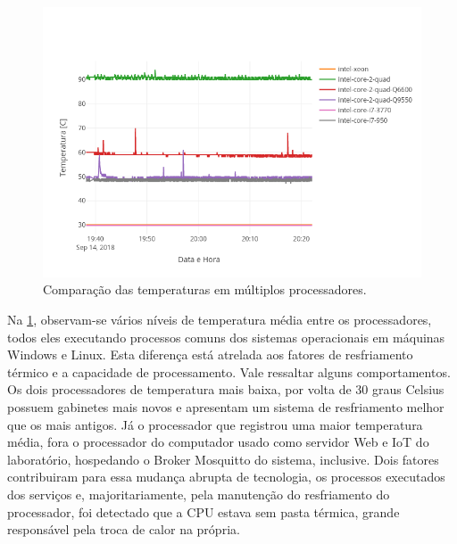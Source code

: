 \begin{figure}[h!]
\centering
\includegraphics[width=16cm]{./02_Capitulos/02_Cap4/figures/temp-devices-5}
\caption{Comparação das temperaturas em múltiplos processadores.}
\label{fig:temp-devices-5}
\end{figure}

Na \ref{fig:temp-devices-5}, observam-se vários níveis de temperatura média entre os processadores, todos eles executando processos comuns dos sistemas operacionais em máquinas Windows e Linux. Esta diferença está atrelada aos fatores de resfriamento térmico e a capacidade de processamento. Vale ressaltar alguns comportamentos. Os dois processadores de temperatura mais baixa, por volta de 30 graus Celsius possuem gabinetes mais novos e apresentam um sistema de resfriamento melhor que os mais antigos. Já o processador que registrou uma maior temperatura média, fora o processador do computador usado como servidor Web e IoT do laboratório, hospedando o Broker Mosquitto do sistema, inclusive. Dois fatores contribuiram para essa mudança abrupta de tecnologia, os processos executados dos serviços e, majoritariamente, pela manutenção do resfriamento do processador, foi detectado que a CPU estava sem pasta térmica, grande responsável pela troca de calor na própria.


